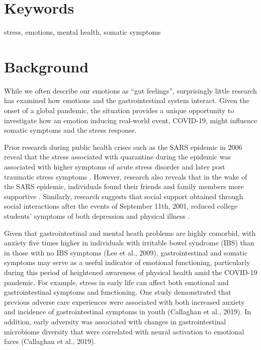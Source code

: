 \documentclass[]{book}
\begin{document}
\hypertarget{keywords}{%
\section{Keywords}\label{keywords}}

stress, emotions, mental health, somatic symptoms

\hypertarget{background}{%
\section{Background}\label{background}}

While we often describe our emotions as ``gut feelings'', surprisingly little research has examined how emotions and the gastrointestinal system interact. Given the onset of a global pandemic, the situation provides a unique opportunity to investigate how an emotion inducing real-world event, COVID-19, might influence somatic symptoms and the stress response.

Prior research during public health crises such as the SARS epidemic in 2006 reveal that the stress associated with quarantine during the epidemic was associated with higher symptoms of acute stress disorder and later post traumatic stress symptoms \citep{baiSurveyStressReactions2004}. However, research also reveals that in the wake of the SARS epidemic, individuals found their friends and family members more supportive \citep{lauPositiveMentalHealthrelated2006}. Similarly, research suggests that social support obtained through social interactions after the events of September 11th, 2001, reduced college students' symptoms of both depression and physical illness \citep{macgeorgeStressSocialSupport2004}.

Given that gastrointestinal and mental heath problems are highly comorbid, with anxiety five times higher in individuals with irritable bowel syndrome (IBS) than in those with no IBS symptoms (Lee et al., 2009), gastrointestinal and somatic symptoms may serve as a useful indicator of emotional functioning, particularly during this period of heightened awareness of physical health amid the COVID-19 pandemic. For example, stress in early life can affect both emotional and gastrointestinal symptoms and functioning. One study demonstrated that previous adverse care experiences were associated with both increased anxiety and incidence of gastrointestinal symptoms in youth (Callaghan et al., 2019). In addition, early adversity was associated with changes in gastrointestinal microbiome diversity that were correlated with neural activation to emotional faces (Callaghan et al., 2019).
\end{document}
